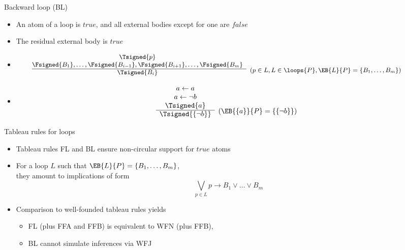 \begin{frame}{Backward loop (BL)}

\begin{itemize}
\item {} An atom of a loop is $\mathit{true}$,
  and all external bodies except for one are $\mathit{false}$
\item {} The residual external body is $\mathit{true}$
\item {}
\[
\hspace{-10mm}
{\small
\begin{array}{@{}cl}
\Tsigned{p} \\
\Fsigned{B_1},\dots,\Fsigned{B_{i-1}},\Fsigned{B_{i+1}},\dots,\Fsigned{B_m} &
\raisebox{-8pt}[0pt][0pt]{($p \in L, L \in \loops{P}, \EB{L}{P}=\{B_1,\dots,B_m\}$)}
\\\cline{1-1}
\Tsigned{B_i}
\end{array}
}
\]
\item<2-> 
\[
\begin{array}{cl}
a \leftarrow a \\
a \leftarrow \neg b \\
\Tsigned{a}&
\raisebox{-8pt}[0pt][0pt]{($\EB{\{a\}}{P}=\{\{\neg b\}\}$)}
\\\cline{1-1}
\Tsigned{\{\neg b\}}
\end{array}
\]
\end{itemize}
\end{frame}
\begin{frame}{Tableau rules for loops}
  \begin{itemize}
  \item<1-> Tableau rules FL and BL ensure non-circular support for $\mathit{true}$ atoms
  \item<2-> For a loop $L$ such that $\EB{L}{P}=\{B_1,\dots,B_m\}$,\\
    they amount to implications of form
    \[
    \textstyle\bigvee_{p\in L} p \rightarrow B_1 \vee\dots\vee B_m
    \]
  \item<3-> Comparison to well-founded tableau rules yields
    \begin{itemize}
    \item FL (plus FFA and FFB) is equivalent to WFN (plus FFB),
    \item BL cannot simulate inferences via WFJ
    \end{itemize}
  \end{itemize}
\end{frame}
